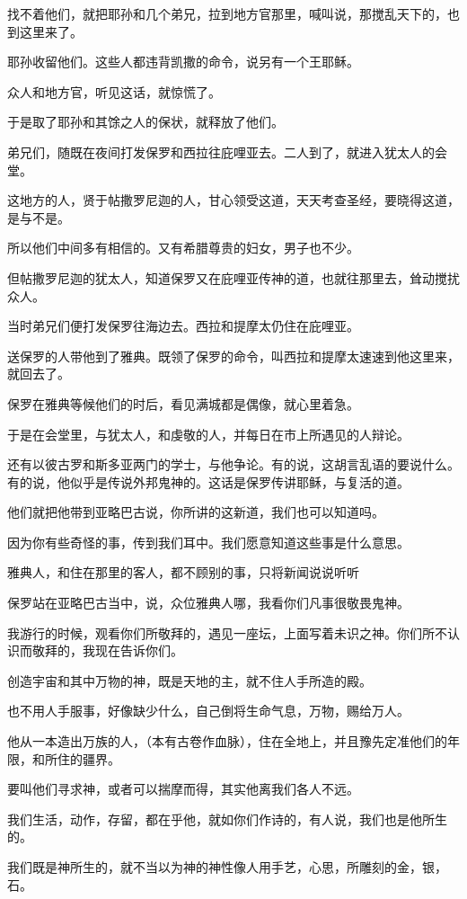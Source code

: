 \documentclass[12pt,oneside]{book}
\begin{document}
找不着他们，就把耶孙和几个弟兄，拉到地方官那里，喊叫说，那搅乱天下的，也到这里来了。

耶孙收留他们。这些人都违背凯撒的命令，说另有一个王耶稣。

众人和地方官，听见这话，就惊慌了。

于是取了耶孙和其馀之人的保状，就释放了他们。

弟兄们，随既在夜间打发保罗和西拉往庇哩亚去。二人到了，就进入犹太人的会堂。

这地方的人，贤于帖撒罗尼迦的人，甘心领受这道，天天考查圣经，要晓得这道，是与不是。

所以他们中间多有相信的。又有希腊尊贵的妇女，男子也不少。

但帖撒罗尼迦的犹太人，知道保罗又在庇哩亚传神的道，也就往那里去，耸动搅扰众人。

当时弟兄们便打发保罗往海边去。西拉和提摩太仍住在庇哩亚。

送保罗的人带他到了雅典。既领了保罗的命令，叫西拉和提摩太速速到他这里来，就回去了。

保罗在雅典等候他们的时后，看见满城都是偶像，就心里着急。

于是在会堂里，与犹太人，和虔敬的人，并每日在市上所遇见的人辩论。

还有以彼古罗和斯多亚两门的学士，与他争论。有的说，这胡言乱语的要说什么。有的说，他似乎是传说外邦鬼神的。这话是保罗传讲耶稣，与复活的道。

他们就把他带到亚略巴古说，你所讲的这新道，我们也可以知道吗。

因为你有些奇怪的事，传到我们耳中。我们愿意知道这些事是什么意思。

雅典人，和住在那里的客人，都不顾别的事，只将新闻说说听听

保罗站在亚略巴古当中，说，众位雅典人哪，我看你们凡事很敬畏鬼神。

我游行的时候，观看你们所敬拜的，遇见一座坛，上面写着未识之神。你们所不认识而敬拜的，我现在告诉你们。

创造宇宙和其中万物的神，既是天地的主，就不住人手所造的殿。

也不用人手服事，好像缺少什么，自己倒将生命气息，万物，赐给万人。

他从一本造出万族的人，（本有古卷作血脉），住在全地上，并且豫先定准他们的年限，和所住的疆界。

要叫他们寻求神，或者可以揣摩而得，其实他离我们各人不远。

我们生活，动作，存留，都在乎他，就如你们作诗的，有人说，我们也是他所生的。

我们既是神所生的，就不当以为神的神性像人用手艺，心思，所雕刻的金，银，石。
\end{document}
